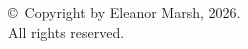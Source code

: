 \thispagestyle{empty}
\vspace*{1.5in}
\begin{center}
\copyright\ Copyright by Eleanor Marsh, 2026.\\
All rights reserved.
\end{center}
\clearpage
